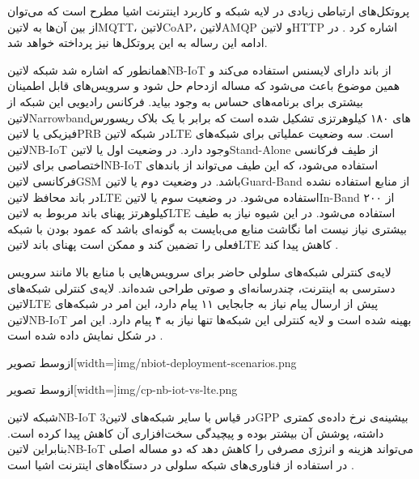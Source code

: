 پروتکل‌های ارتباطی زیادی در لایه شبکه و کاربرد اینترنت اشیا مطرح است که می‌توان از بین آن‌ها به ‌لاتین{MQTT}، ‌لاتین{CoAP}، ‌لاتین{AMQP} و ‌لاتین{HTTP} اشاره کرد
. در ادامه این رساله به این پروتکل‌ها نیز پرداخته خواهد شد.


همانطور که اشاره شد شبکه ‌لاتین{NB-IoT} از باند دارای لایسنس استفاده می‌کند و همین موضوع باعث می‌شود که مساله ازدحام حل شود و سرویس‌های
قابل اطمینان بیشتری برای برنامه‌های حساس به وجود بیاید.
فرکانس رادیویی این شبکه از ‌لاتین{Narrowband}های ۱۸۰ کیلوهرتزی تشکیل شده است که برابر با یک بلاک ریسورس فیزیکی یا ‌لاتین{PRB} در شبکه ‌لاتین{LTE} است.
سه وضعیت عملیاتی برای شبکه‌های ‌لاتین{NB-IoT} وجود دارد.
در وضعیت اول یا ‌لاتین{Stand-Alone} از طیف فرکانسی اختصاصی برای ‌لاتین{NB-IoT} استفاده می‌شود، که این طیف می‌تواند از باندهای فرکانسی ‌لاتین{GSM} باشد.
در وضعیت دوم یا ‌لاتین{Guard-Band} از منابع استفاده نشده در باند محافظ ‌لاتین{LTE} استفاده می‌شود.
در وضعیت سوم یا ‌لاتین{In-Band} از ۲۰۰ کیلوهرتز پهنای باند مربوط به ‌لاتین{LTE} استفاده می‌شود. در این شیوه نیاز به طیف بیشتری نیاز نیست اما نگاشت منابع می‌بایست به گونه‌ای باشد
که عمود بودن با شبکه فعلی را تضمین کند و ممکن است پهنای باند ‌لاتین{LTE} کاهش پیدا کند
.

لایه‌ی کنترلی شبکه‌های سلولی حاضر برای سرویس‌هایی با منابع بالا مانند سرویس دسترسی به اینترنت، چندرسانه‌ای و صوتی
طراحی شده‌اند.
لایه‌ی کنترلی شبکه‌های ‌لاتین{LTE} پیش از ارسال پیام نیاز به جابجایی ۱۱ پیام دارد، این امر در شبکه‌های ‌لاتین{NB-IoT}
بهینه شده است و لایه کنترلی این شبکه‌ها تنها نیاز به ۴ پیام دارد. این امر در شکل 
نمایش داده شده است
.

‌ازوسط
‌تصویر[width=\textwidth]{img/nbiot-deployment-scenarios.png}

‌ازوسط
‌تصویر[width=\textwidth]{img/cp-nb-iot-vs-lte.png}

شبکه ‌لاتین{NB-IoT} در قیاس با سایر شبکه‌های ‌لاتین{3GPP} بیشینه‌ی نرخ داده‌ی کمتری داشته،
پوشش آن بیشتر بوده و پیچیدگی سخت‌افزاری آن کاهش پیدا کرده است.
بنابراین ‌لاتین{NB-IoT} می‌تواند هزینه و انرژی مصرفی را کاهش دهد که دو مساله اصلی در استفاده از فناوری‌های
شبکه سلولی در دستگاه‌های اینترنت اشیا است
.

